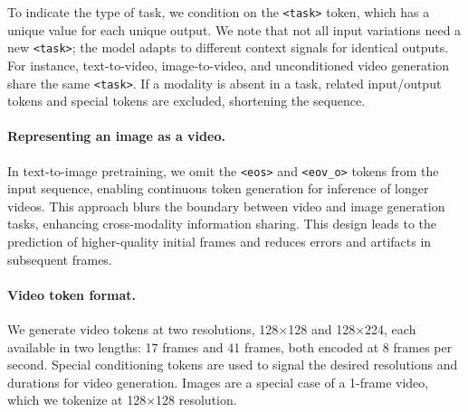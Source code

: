 
To indicate the type of task, we condition on the \texttt{<task>} token, which has a unique value for each unique output.
%
We note that not all input variations need a new \texttt{<task>}; the model adapts to different context signals for identical outputs. 
%
For instance, text-to-video, image-to-video, and unconditioned video generation share the same \texttt{<task>}.
%
If a modality is absent in a task, related input/output tokens and special tokens are excluded, shortening the sequence.

\vspace{-3mm}
\paragraph{Representing an image as a video.}
In text-to-image pretraining, we omit the \texttt{<eos>} and \texttt{<eov\_o>} tokens from the input sequence, enabling continuous token generation for inference of longer videos.
%
This approach blurs the boundary between video and image generation tasks, enhancing cross-modality information sharing. 
%
This design leads to the prediction of higher-quality initial frames and reduces errors and artifacts in subsequent frames.

\vspace{-3mm}
\paragraph{Video token format.} 
We generate video tokens at two resolutions, 128$\times$128 and 128$\times$224, each available in two lengths: 17 frames and 41 frames, both encoded at 8 frames per second. 
%
Special conditioning tokens are used to signal the desired resolutions and durations for video generation.
Images are a special case of a 1-frame video, which we tokenize at 128$\times$128 resolution.

